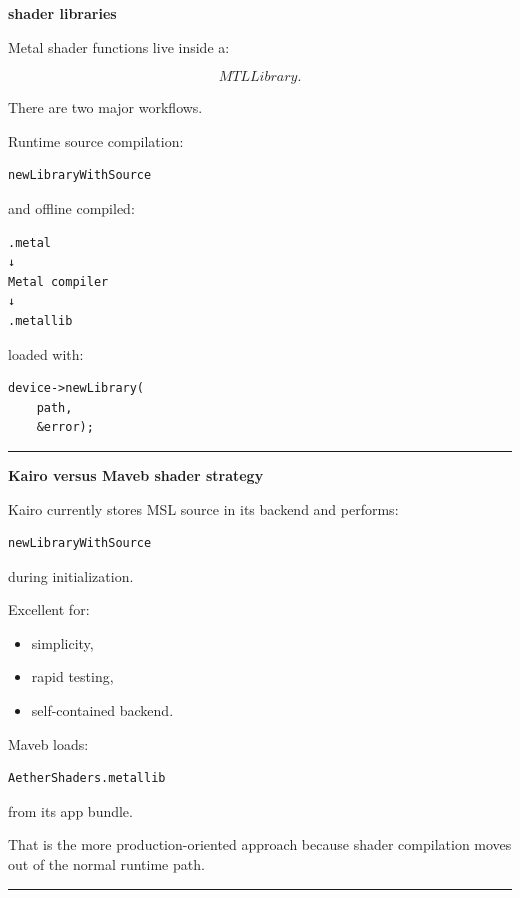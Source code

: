 \textbf{shader libraries}

Metal shader functions live inside a:

\[
MTLLibrary.
\]

There are two major workflows.

Runtime source compilation:

\begin{verbatim}
newLibraryWithSource
\end{verbatim}

and offline compiled:

\begin{verbatim}
.metal
↓
Metal compiler
↓
.metallib
\end{verbatim}

loaded with:

\begin{verbatim}
device->newLibrary(
    path,
    &error);
\end{verbatim}

\begin{center}\rule{0.5\linewidth}{0.5pt}\end{center}

\textbf{Kairo versus Maveb shader strategy}

Kairo currently stores MSL source in its backend and performs:

\begin{verbatim}
newLibraryWithSource
\end{verbatim}

during initialization.

Excellent for:

\begin{itemize}
\tightlist
\item
  simplicity,
\item
  rapid testing,
\item
  self-contained backend.
\end{itemize}

Maveb loads:

\begin{verbatim}
AetherShaders.metallib
\end{verbatim}

from its app bundle.

That is the more production-oriented approach because shader compilation moves out of the normal runtime path.

\begin{center}\rule{0.5\linewidth}{0.5pt}\end{center}

